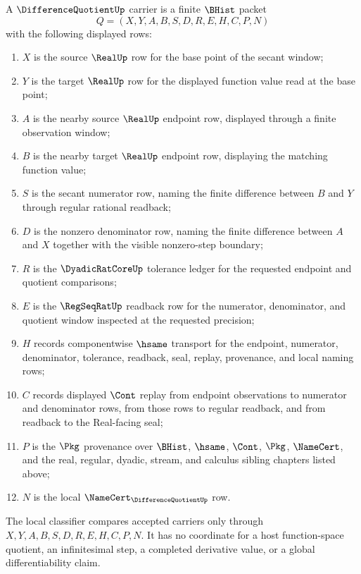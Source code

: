 \begin{definition}
\label{def:difference-quotient-carrier}
A $\DifferenceQuotientUp$ carrier is a finite $\BHist$ packet
$$
Q=(X,Y,A,B,S,D,R,E,H,C,P,N)
$$
with the following displayed rows:
\begin{enumerate}
\item $X$ is the source $\RealUp$ row for the base point of the secant window;
\item $Y$ is the target $\RealUp$ row for the displayed function value read at the base point;
\item $A$ is the nearby source $\RealUp$ endpoint row, displayed through a finite observation window;
\item $B$ is the nearby target $\RealUp$ endpoint row, displaying the matching function value;
\item $S$ is the secant numerator row, naming the finite difference between $B$ and $Y$ through regular rational readback;
\item $D$ is the nonzero denominator row, naming the finite difference between $A$ and $X$ together with the visible nonzero-step boundary;
\item $R$ is the $\DyadicRatCoreUp$ tolerance ledger for the requested endpoint and quotient comparisons;
\item $E$ is the $\RegSeqRatUp$ readback row for the numerator, denominator, and quotient window inspected at the requested precision;
\item $H$ records componentwise $\hsame$ transport for the endpoint, numerator, denominator, tolerance, readback, seal, replay, provenance, and local naming rows;
\item $C$ records displayed $\Cont$ replay from endpoint observations to numerator and denominator rows, from those rows to regular readback, and from readback to the Real-facing seal;
\item $P$ is the $\Pkg$ provenance over $\BHist$, $\hsame$, $\Cont$, $\Pkg$, $\NameCert$, and the real, regular, dyadic, stream, and calculus sibling chapters listed above;
\item $N$ is the local $\NameCert_{\DifferenceQuotientUp}$ row.
\end{enumerate}
The local classifier compares accepted carriers only through $X,Y,A,B,S,D,R,E,H,C,P,N$. It has no coordinate for a host function-space quotient, an infinitesimal step, a completed derivative value, or a global differentiability claim.
\end{definition}

